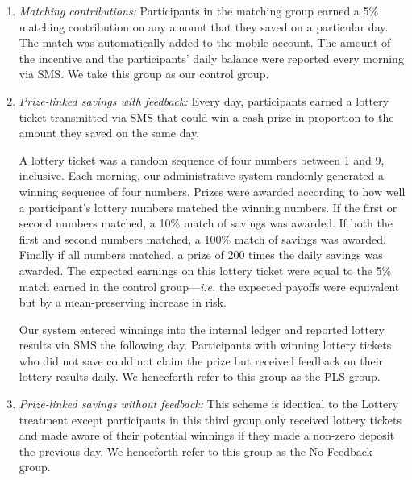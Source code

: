 \documentclass[11pt]{article}
\begin{document}
		\begin{enumerate} \setlength{\itemsep}{1pt}

			\item \textit{Matching contributions:} Participants in the matching group earned a 5\% matching contribution on any amount that they saved on a particular day. The match was automatically added to the mobile account. The amount of the incentive and the participants' daily balance were reported every morning via SMS. We take this group as our control group.

			\item \textit{Prize-linked savings with feedback:} Every day, participants earned a lottery ticket transmitted via SMS that could win a cash prize in proportion to the amount they saved on the same day.

			A lottery ticket was a random sequence of four numbers between 1 and 9, inclusive. Each morning, our administrative system randomly generated a winning sequence of four numbers. Prizes were awarded according to how well a participant's lottery numbers matched the winning numbers. If the first or second numbers matched, a 10\% match of savings was awarded. If both the first and second numbers matched, a 100\% match of savings was awarded. Finally if all numbers matched, a prize of 200 times the daily savings was awarded. The expected earnings on this lottery ticket were equal to the 5\% match earned in the control group---\textit{i.e.} the expected payoffs were equivalent but by a mean-preserving increase in risk.

			Our system entered winnings into the internal ledger and reported lottery results via SMS the following day. Participants with winning lottery tickets who did not save could not claim the prize but received feedback on their lottery results daily. We henceforth refer to this group as the PLS group. 

			\item \textit{Prize-linked savings without feedback:} This scheme is identical to the Lottery treatment except participants in this third group only received lottery tickets and made aware of their potential winnings if they made a non-zero deposit the previous day. We henceforth refer to this group as the No Feedback group.

		\end{enumerate}

		

		\clearpage
\end{document}
